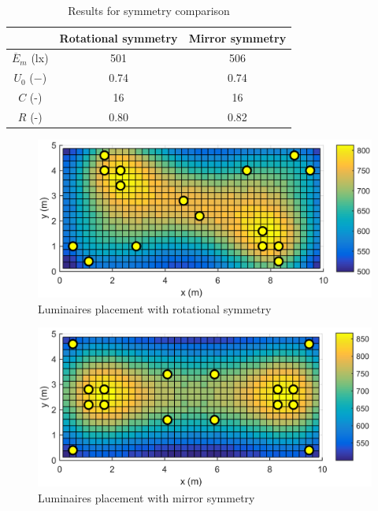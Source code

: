 \begin{table}[b]
	\renewcommand{\arraystretch}{1.3}
	\caption{Results for symmetry comparison}
 	\label{tab:symmetry}
	\centering
  \begin{tabular}{| c | c | c |}
    \hline
    & \textbf{Rotational symmetry} & \textbf{Mirror symmetry} \\
    \hline
    $\overline{E}_{m}$ (lx) & 501 & 506 \\
    \hline
		$U_0$ ($-$)& 0.74 & 0.74 \\
    \hline
		$C$ (-) & 16 & 16 \\
	\hline
		$R$ (-) & 0.80 & 0.82 \\
  \hline
  \end{tabular}
\end{table}
\begin{figure}[b]
  \centering
  \includegraphics[width=\columnwidth]{MSTR_SLB_4x18W_5G4_Fit2_V010_S0}
  \caption{Luminaires placement with rotational symmetry}
  \label{fig:V010_S0}
\end{figure}
\begin{figure}[b]
  \centering
  \includegraphics[width=\columnwidth]{../Vysledky/MSTR_SLB_4x18W_5G4_Fit2_V010_S1}
  \caption{Luminaires placement with mirror symmetry}
  \label{fig:V010_S1}
\end{figure}

